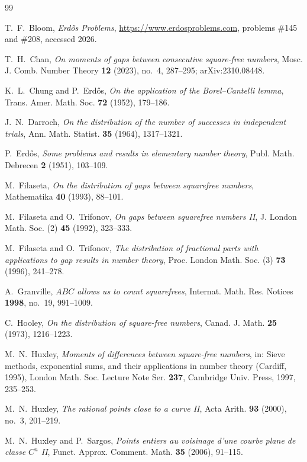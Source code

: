 \documentclass[11pt,reqno]{amsart}
\theoremstyle{plain}
\theoremstyle{definition}
\numberwithin{equation}{section}
\begin{document}
\begin{thebibliography}{99}

T.~F.~Bloom,
\emph{Erd\H{o}s Problems},
\url{https://www.erdosproblems.com}, problems \#145 and \#208, accessed 2026.

T.~H.~Chan,
\emph{On moments of gaps between consecutive square-free numbers},
Mosc. J. Comb. Number Theory \textbf{12} (2023), no.~4, 287--295;
arXiv:2310.08448.

K.~L.~Chung and P.~Erd\H{o}s,
\emph{On the application of the Borel--Cantelli lemma},
Trans. Amer. Math. Soc. \textbf{72} (1952), 179--186.

J.~N.~Darroch,
\emph{On the distribution of the number of successes in independent trials},
Ann. Math. Statist. \textbf{35} (1964), 1317--1321.

P.~Erd\H{o}s,
\emph{Some problems and results in elementary number theory},
Publ. Math. Debrecen \textbf{2} (1951), 103--109.

M.~Filaseta,
\emph{On the distribution of gaps between squarefree numbers},
Mathematika \textbf{40} (1993), 88--101.

M.~Filaseta and O.~Trifonov,
\emph{On gaps between squarefree numbers II},
J. London Math. Soc. (2) \textbf{45} (1992), 323--333.

M.~Filaseta and O.~Trifonov,
\emph{The distribution of fractional parts with applications to gap results in number
theory},
Proc. London Math. Soc. (3) \textbf{73} (1996), 241--278.

A.~Granville,
\emph{$ABC$ allows us to count squarefrees},
Internat. Math. Res. Notices \textbf{1998}, no.~19, 991--1009.

C.~Hooley,
\emph{On the distribution of square-free numbers},
Canad. J. Math. \textbf{25} (1973), 1216--1223.

M.~N.~Huxley,
\emph{Moments of differences between square-free numbers},
in: Sieve methods, exponential sums, and their applications in number theory
(Cardiff, 1995), London Math. Soc. Lecture Note Ser. \textbf{237},
Cambridge Univ. Press, 1997, 235--253.

M.~N.~Huxley,
\emph{The rational points close to a curve II},
Acta Arith. \textbf{93} (2000), no.~3, 201--219.

M.~N.~Huxley and P.~Sargos,
\emph{Points entiers au voisinage d'une courbe plane de classe $C^{n}$ II},
Funct. Approx. Comment. Math. \textbf{35} (2006), 91--115.


\end{thebibliography}
\end{document}
